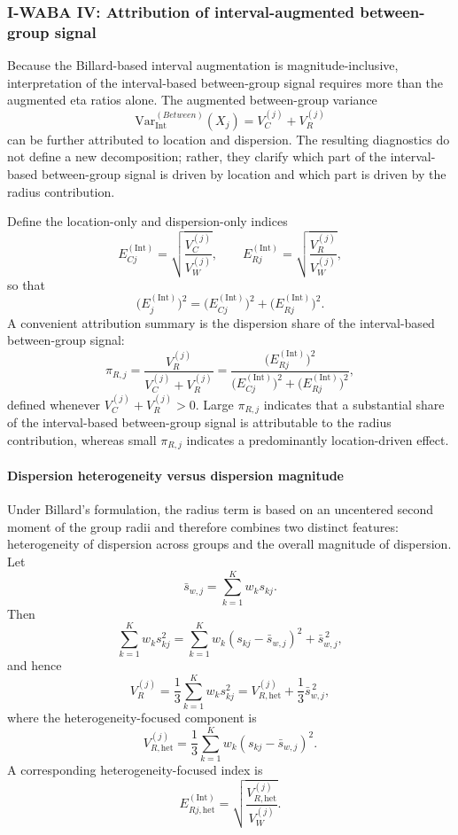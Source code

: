 \documentclass[preprint, times, 12pt, authoryear]{elsarticle}
\begin{document}
\subsubsection{I-WABA IV: Attribution of interval-augmented between-group signal}\label{sec:iwaba_IV}

Because the Billard-based interval augmentation is magnitude-inclusive, interpretation of the interval-based between-group signal requires more than the augmented eta ratios alone. The augmented between-group variance
\[
\mathrm{Var}_{\mathrm{Int}}^{(Between)}(X_j)=V_C^{(j)}+V_R^{(j)}
\]
can be further attributed to location and dispersion. The resulting diagnostics do not define a new decomposition; rather, they clarify which part of the interval-based between-group signal is driven by location and which part is driven by the radius contribution.

Define the location-only and dispersion-only indices
\begin{equation}\label{eq:EC_ER}
	E_{Cj}^{(\mathrm{Int})}
	=
	\sqrt{\frac{V_C^{(j)}}{V_W^{(j)}}},
	\qquad
	E_{Rj}^{(\mathrm{Int})}
	=
	\sqrt{\frac{V_R^{(j)}}{V_W^{(j)}}},
\end{equation}
so that
\[
\big(E_j^{(\mathrm{Int})}\big)^2
=
\big(E_{Cj}^{(\mathrm{Int})}\big)^2
+
\big(E_{Rj}^{(\mathrm{Int})}\big)^2.
\]
A convenient attribution summary is the dispersion share of the interval-based between-group signal:
\begin{equation}\label{eq:radius_share}
	\pi_{R,j}
	=
	\frac{V_R^{(j)}}{V_C^{(j)}+V_R^{(j)}}
	=
	\frac{\big(E_{Rj}^{(\mathrm{Int})}\big)^2}
	{\big(E_{Cj}^{(\mathrm{Int})}\big)^2+\big(E_{Rj}^{(\mathrm{Int})}\big)^2},
\end{equation}
defined whenever \(V_C^{(j)}+V_R^{(j)}>0\). Large \(\pi_{R,j}\) indicates that a substantial share of the interval-based between-group signal is attributable to the radius contribution, whereas small \(\pi_{R,j}\) indicates a predominantly location-driven effect.

\paragraph{Dispersion heterogeneity versus dispersion magnitude}
Under Billard's formulation, the radius term is based on an uncentered second moment of the group radii and therefore combines two distinct features: heterogeneity of dispersion across groups and the overall magnitude of dispersion. Let
\[
\bar s_{w,j}=\sum_{k=1}^K w_k s_{kj}.
\]
Then
\[
\sum_{k=1}^K w_k s_{kj}^2
=
\sum_{k=1}^K w_k(s_{kj}-\bar s_{w,j})^2
+
\bar s_{w,j}^{\,2},
\]
and hence
\[
V_R^{(j)}
=
\frac13\sum_{k=1}^K w_k s_{kj}^2
=
V_{R,\mathrm{het}}^{(j)}+\frac13\bar s_{w,j}^{\,2},
\]
where the heterogeneity-focused component is
\[
V_{R,\mathrm{het}}^{(j)}
=
\frac13\sum_{k=1}^K w_k(s_{kj}-\bar s_{w,j})^2.
\]
A corresponding heterogeneity-focused index is
\[
E_{Rj,\mathrm{het}}^{(\mathrm{Int})}
=
\sqrt{\frac{V_{R,\mathrm{het}}^{(j)}}{V_W^{(j)}}}.
\]
\end{document}
